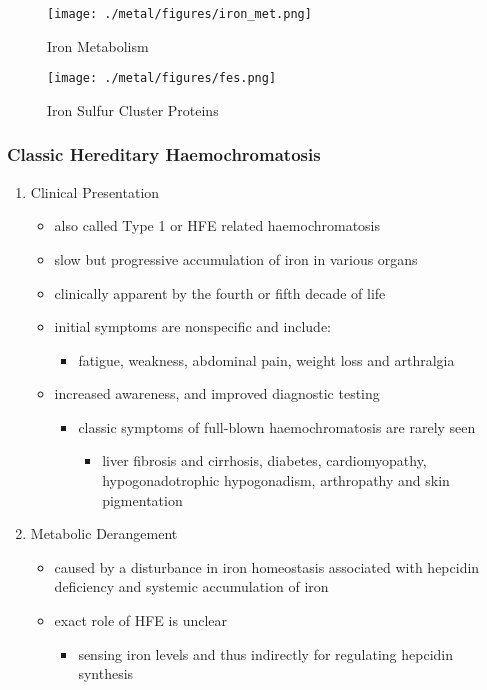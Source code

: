 \documentclass{scrartcl}
\begin{document}
\begin{figure}[htbp]
\centering
\texttt{[image: ./metal/figures/iron\_met.png]}
\caption[iron]{\label{fig:orgb6bcd4e}
Iron Metabolism}
\end{figure}

\begin{figure}[htbp]
\centering
\texttt{[image: ./metal/figures/fes.png]}
\caption[fes]{\label{fig:orgdbf6e6c}
Iron Sulfur Cluster Proteins}
\end{figure}

\subsubsection{Classic Hereditary Haemochromatosis}
\label{sec:org959074d}
\begin{enumerate}
\item Clinical Presentation
\label{sec:orgafbc198}
\begin{itemize}
\item also called Type 1 or HFE related haemochromatosis
\item slow but progressive accumulation of iron in various organs
\item clinically apparent by the fourth or fifth decade of life
\item initial symptoms are nonspecific and include:
\begin{itemize}
\item fatigue, weakness, abdominal pain, weight loss and arthralgia
\end{itemize}
\item increased awareness, and improved diagnostic testing
\begin{itemize}
\item classic symptoms of full-blown haemochromatosis are rarely seen
\begin{itemize}
\item liver fibrosis and cirrhosis, diabetes, cardiomyopathy,
hypogonadotrophic hypogonadism, arthropathy and skin
pigmentation
\end{itemize}
\end{itemize}
\end{itemize}

\item Metabolic Derangement
\label{sec:orga6d1ae3}
\begin{itemize}
\item caused by a disturbance in iron homeostasis associated with hepcidin
deficiency and systemic accumulation of iron
\item exact role of HFE is unclear
\begin{itemize}
\item sensing iron levels and thus indirectly for regulating hepcidin
synthesis
\end{itemize}
\end{itemize}


\end{enumerate}
\end{document}
